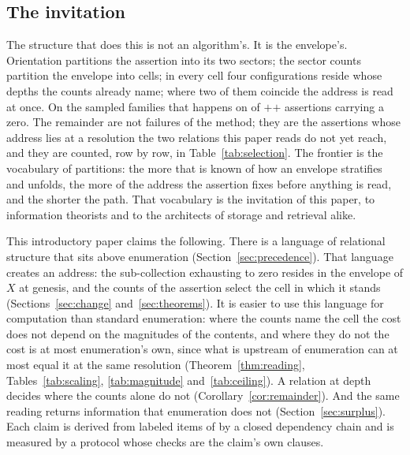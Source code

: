 \documentclass[pdflatex,sn-mathphys-num]{sn-jnl}
\theoremstyle{thmstyleone}%
\theoremstyle{thmstyletwo}%
\theoremstyle{thmstylethree}%
\newcommand{\PA}{\cite{Swanagon2026PA}}
\begin{document}
\begin{table}[!htbp]
\centering
\caption{The structural reading of Table~\ref{tab:worked}, itemised. Protocol~C.9 certifies that the ledger sums to the measured count.}
\label{tab:ledger}

\end{table}

\subsection{The invitation}
The structure that does this is not an algorithm's. It is the envelope's. Orientation partitions the assertion into its two sectors; the sector counts partition the envelope into cells; in every cell four configurations reside whose depths the counts already name; where two of them coincide the address is read at once. On the sampled families that happens on \selFirst{} of \selFirst{}$+$\selSecond{}$+$\selLater{} assertions carrying a zero. The remainder are not failures of the method; they are the assertions whose address lies at a resolution the two relations this paper reads do not yet reach, and they are counted, row by row, in Table~\ref{tab:selection}. The frontier is the vocabulary of partitions: the more that is known of how an envelope stratifies and unfolds, the more of the address the assertion fixes before anything is read, and the shorter the path. That vocabulary is the invitation of this paper, to information theorists and to the architects of storage and retrieval alike.

This introductory paper claims the following. There is a language of relational structure that sits above enumeration (Section~\ref{sec:precedence}). That language creates an address: the sub-collection exhausting to zero resides in the envelope of $X$ at genesis, and the counts of the assertion select the cell in which it stands (Sections~\ref{sec:change} and~\ref{sec:theorems}). It is easier to use this language for computation than standard enumeration: where the counts name the cell the cost does not depend on the magnitudes of the contents, and where they do not the cost is at most enumeration's own, since what is upstream of enumeration can at most equal it at the same resolution (Theorem~\ref{thm:reading}, Tables~\ref{tab:scaling}, \ref{tab:magnitude} and~\ref{tab:ceiling}). A relation at depth decides where the counts alone do not (Corollary~\ref{cor:remainder}). And the same reading returns information that enumeration does not (Section~\ref{sec:surplus}). Each claim is derived from labeled items of \PA{} by a closed dependency chain and is measured by a protocol whose checks are the claim's own clauses.
\end{document}
